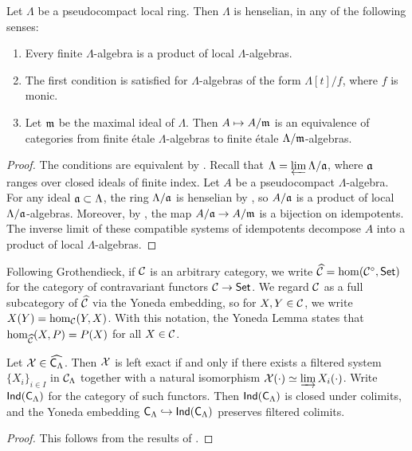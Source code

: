\begin{lemma}
Let $\Lambda$ be a pseudocompact local ring. Then $\Lambda$ is henselian, in 
any of the following senses:
\begin{enumerate}
\item
Every finite $\Lambda$-algebra is a product of local $\Lambda$-algebras.

\item
The first condition is satisfied for $\Lambda$-algebras of the form 
$\Lambda[t]/f$, where $f$ is monic. 

\item
Let $\mathfrak{m}$ be the maximal ideal of $\Lambda$. Then $A\mapsto A/\mathfrak{m}$ is an 
equivalence of categories from finite \'etale $\Lambda$-algebras to 
finite \'etale $\Lambda/\mathfrak{m}$-algebras. 
\end{enumerate}
\end{lemma}
\begin{proof}
The conditions are equivalent by \cite[18.5.11]{ega4-4}. Recall that 
$\Lambda = \varprojlim \Lambda/\mathfrak{a}$, where $\mathfrak{a}$ ranges over closed ideals of 
finite index. Let $A$ be a pseudocompact $\Lambda$-algebra. For any 
ideal $\mathfrak{a}\subset \Lambda$, the ring $\Lambda/\mathfrak{a}$ is henselian by 
\cite[18.5.14]{ega4-4}, so $A/\mathfrak{a}$ is a product of local 
$\Lambda/\mathfrak{a}$-algebras. Moreover, by \cite[18.5.4]{ega4-4}, the map 
$A/\mathfrak{a} \to A/\mathfrak{m}$ is a bijection on idempotents. The inverse limit of 
these compatible systems of idempotents decompose $A$ into a product of local 
$\Lambda$-algebras. 
\end{proof}

Following Grothendieck, if $\mathcal{C}$ is an arbitrary category, we write 
$\widehat{\mathcal{C}}=\hom(\mathcal{C}^\circ,\mathsf{Set})$ for the category of contravariant functors 
$\mathcal{C}\to \mathsf{Set}$. We regard $\mathcal{C}$ as a full subcategory of $\widehat{\mathcal{C}}$ via the 
Yoneda embedding, so for $X,Y\in \mathcal{C}$, we write $X(Y) = \hom_{\mathcal{C}}(Y,X)$. With 
this notation, the Yoneda Lemma states that $\hom_{\widehat{\mathcal{C}}}(X,P) = P(X)$ 
for all $X\in \mathcal{C}$. 

\begin{lemma}\label{thm:ind-object-def}
Let $\mathcal{X}\in\widehat{\mathsf{C}_\Lambda}$. Then $\mathcal{X}$ is left exact if and only 
if there exists a filtered system $\{X_i\}_{i\in I}$ in $\mathcal{C}_\Lambda$ together 
with a natural isomorphism $\mathcal{X}(\cdot)\simeq \varinjlim X_i(\cdot)$. Write 
$\operatorname{\mathsf{Ind}}(\mathsf{C}_\Lambda)$ for the category of such functors. Then 
$\operatorname{\mathsf{Ind}}(\mathsf{C}_\Lambda)$ is closed under colimits, and the 
Yoneda embedding $\mathsf{C}_\Lambda\hookrightarrow\operatorname{\mathsf{Ind}}(\mathsf{C}_\Lambda)$ 
preserves filtered colimits.
\end{lemma}
\begin{proof}
This follows from the results of \cite[6.1]{kashiwara-schapira-2006}. 
\end{proof}

